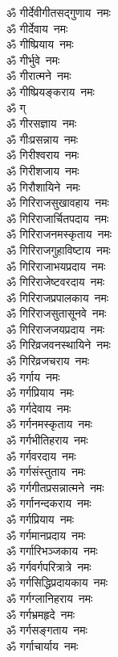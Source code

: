 \begin{multicols}{2}
\begin{flushleft}
ॐ गीर्देवीगीतसद्गुणाय~नमः\\
ॐ गीर्देवाय~नमः\\
ॐ गीष्प्रियाय~नमः\\
ॐ गीर्भुवे~नमः\\
ॐ गीरात्मने~नमः\\
ॐ गीष्प्रियङ्कराय~नमः\\
ॐ ग्\\
ॐ गीरसज्ञाय~नमः\hfill{}\\
ॐ गीःप्रसन्नाय~नमः\\
ॐ गिरीश्वराय~नमः\\
ॐ गिरीशजाय~नमः\\
ॐ गिरौशायिने~नमः\\
ॐ गिरिराजसुखावहाय~नमः\\
ॐ गिरिराजार्चितपदाय~नमः\\
ॐ गिरिराजनमस्कृताय~नमः\\
ॐ गिरिराजगुहाविष्टाय~नमः\\
ॐ गिरिराजाभयप्रदाय~नमः\\
ॐ गिरिराजेष्टवरदाय~नमः\hfill{}\\
ॐ गिरिराजप्रपालकाय~नमः\\
ॐ गिरिराजसुतासूनवे~नमः\\
ॐ गिरिराजजयप्रदाय~नमः\\
ॐ गिरिव्रजवनस्थायिने~नमः\\
ॐ गिरिव्रजचराय~नमः\\
ॐ गर्गाय~नमः\\
ॐ गर्गप्रियाय~नमः\\
ॐ गर्गदेवाय~नमः\\
ॐ गर्गनमस्कृताय~नमः\\
ॐ गर्गभीतिहराय~नमः\hfill{}\\
ॐ गर्गवरदाय~नमः\\
ॐ गर्गसंस्तुताय~नमः\\
ॐ गर्गगीतप्रसन्नात्मने~नमः\\
ॐ गर्गानन्दकराय~नमः\\
ॐ गर्गप्रियाय~नमः\\
ॐ गर्गमानप्रदाय~नमः\\
ॐ गर्गारिभञ्जकाय~नमः\\
ॐ गर्गवर्गपरित्रात्रे~नमः\\
ॐ गर्गसिद्धिप्रदायकाय~नमः\\
ॐ गर्गग्लानिहराय~नमः\hfill{}\\
ॐ गर्गभ्रमहृदे~नमः\\
ॐ गर्गसङ्गताय~नमः\\
ॐ गर्गाचार्याय~नमः\\

\end{flushleft}
\end{multicols}
